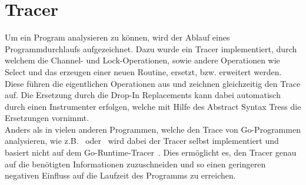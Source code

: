 \chapter{Tracer}\label{Chap:Tracer}
Um ein Program analysieren zu können, wird der Ablauf eines Programmdurchlaufs
aufgezeichnet. Dazu wurde ein Tracer implementiert, durch welchem die 
Channel- und Lock-Operationen, sowie andere Operationen wie Select und das 
erzeugen einer neuen Routine, ersetzt, bzw. erweitert werden. Diese 
führen die eigentlichen Operationen aus und zeichnen gleichzeitig den 
Trace auf. Die Ersetzung durch die Drop-In Replacements kann dabei automatisch 
durch einen Instrumenter erfolgen, welche mit Hilfe des Abstract Syntax Tress 
die Ersetzungen vornimmt.\\
Anders als in vielen anderen Programmen, welche den Trace von Go-Programmen
analysieren, wie z.B.~\cite{GoAt2} oder~\cite{GoVis} wird dabei der Tracer 
selbst implementiert und basiert nicht auf dem Go-Runtime-Tracer~\cite{GoRunTrace}. 
Dies ermöglicht es, den Tracer genau auf die benötigten Informationen zuzuschneiden
und so einen geringeren negativen Einfluss auf die Laufzeit des Programms zu erreichen.



